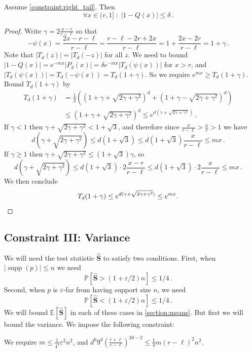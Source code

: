 \documentclass{theoretics}
\DeclareMathOperator{\supp}{supp}   %
\newcommand{\Ex}[1]{\bE \left[ #1 \right]}
\renewcommand{\Pr}[1]{\bP \left[ #1 \right]} %
\newcommand{\bE}{\ensuremath{\mathbb{E}}}
\newcommand{\bP}{\ensuremath{\mathbb{P}}}
\renewcommand{\epsilon}{\varepsilon}
\begin{document}
\begin{proposition}
\label{res:right_tail}
Assume \cref{constraint:right_tail}. Then 
\[
  \forall x \in (r, 1] \;\colon\; |1 - Q(x)| \leq \delta \,.
\]
\end{proposition}
\begin{proof}
Write $\gamma = 2\frac{x-r}{r-\ell}$ so that
\[
  - \psi(x) =  \frac{2x-r-\ell}{r-\ell}
            = \frac{r-\ell - 2r + 2x}{r-\ell}
            = 1 + \frac{2x-2r}{r-\ell}
            = 1 + \gamma \,.
\]
Note that $|T_d(z)|=|T_d(-z)|$ for all $z$.  We need to bound $|1-Q(x)| = e^{-mx} |P_d(x)| = \delta e^{-mx}
| T_d(\psi(x)) |$ for $x > r$, and $|T_d(\psi(x))| = T_d(-\psi(x)) = T_d(1+\gamma)$.  So we require
$e^{mx} \geq T_d(1 + \gamma)$. Bound $T_d(1+\gamma)$ by
\begin{align*}
T_d(1+\gamma)
&= \frac{1}{2}\left((1 + \gamma + \sqrt{2\gamma + \gamma^2})^d + (1+\gamma - \sqrt{2\gamma +
\gamma^2})^d\right) \\
&\leq (1+\gamma+\sqrt{2\gamma+\gamma^2})^d
\leq e^{d(\gamma+\sqrt{2\gamma+\gamma^2})} \,.
\end{align*}
If $\gamma < 1$ then $\gamma + \sqrt{2\gamma+\gamma^2} < 1 + \sqrt{3}$, and therefore since
$\frac{x}{r-\ell} > \frac{x}{r} > 1$ we have
\[
  d(\gamma + \sqrt{2\gamma + \gamma^2}) \leq d (1+\sqrt{3}) \leq d(1+\sqrt{3}) \frac{x}{r-\ell}
  \leq mx \,.
\]
If $\gamma \geq 1$ then $\gamma + \sqrt{2\gamma+\gamma^2} \leq (1+\sqrt{3})\gamma$, so
\[
  d(\gamma + \sqrt{2\gamma + \gamma^2}) \leq d (1+\sqrt{3}) \cdot 2\frac{x-r}{r-\ell}
    \leq d (1+\sqrt{3}) \cdot 2\frac{x}{r-\ell} \leq mx \,.
\]
We then conclude
\[
  T_d(1+\gamma) \leq e^{d(\gamma + \sqrt{2\gamma + \gamma^2})} \leq e^{mx}. \qedhere
\]
\end{proof}

\subsection{Constraint III: Variance}

We will need the test statistic $\widehat{\bm S}$ to satisfy two conditions.
First, when $|\supp(p)| \leq n$ we need
\[
  \Pr{ \widehat{\bm S} > (1+\epsilon/2)n } \leq 1/4 \,.
\]
Second, when $p$ is $\epsilon$-far from having support size $n$, we need
\[
  \Pr{ \widehat{\bm S} < (1+\epsilon/2)n } \leq 1/4 \,.
\]
We will bound $\Ex{\widehat{\bm S}}$ in each of these cases in \cref{section:means}. But first we
will bound the variance.  We impose the following constraint:

\begin{constraint}
\label{constraint:variance}
We require $m \leq \tfrac{1}{4^4} \epsilon^2 n^2$,
and $d^6 9^d \left(\frac{r+\ell}{r-\ell}\right)^{2d-2} \leq \tfrac{1}{4} m(r-\ell)^2 n^2$.
\end{constraint}
\end{document}
